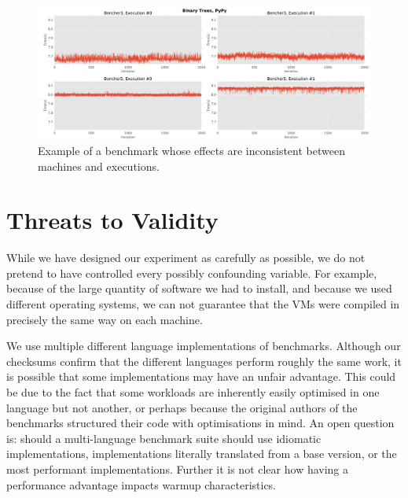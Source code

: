 \documentclass[10pt,preprint]{sigplanconf}
\begin{document}
\begin{figure}[h!]
\centering
\includegraphics[width=\textwidth]{examples/inconsistent_weirdness1}
\caption{Example of a benchmark whose effects are inconsistent between machines and executions.}
\label{fig:examples:inconsistent_weirdness1}
\end{figure}


\section{Threats to Validity}
\label{sec:threats}

While we have designed our experiment as carefully as possible, we do not
pretend to have controlled every possibly confounding variable. For example,
because of the large quantity of software we had to install, and because we used
different operating systems, we can not guarantee that the VMs were compiled in
precisely the same way on each machine. 

We use multiple different language implementations of benchmarks. Although our
checksums confirm that the different languages perform roughly the same work,
it is possible that some implementations may have an unfair advantage. This
could be due to the fact that some workloads are inherently easily optimised in
one language but not another, or perhaps because the original authors of the
benchmarks structured their code with optimisations in mind. An open question
is: should a multi-language benchmark suite should use idiomatic
implementations, implementations literally translated from a base version, or
the most performant implementations. Further it is not clear how having a
performance advantage impacts warmup characteristics.
\end{document}
